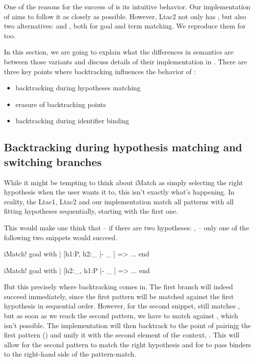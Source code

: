 One of the reasons for the success of  is its intuitive behavior.
Our implementation of  aims to follow it as closely as possible.
However, Ltac2 not only has , but also two alternatives:  and , both for goal and term matching.
We reproduce them for  too.

In this section, we are going to explain what the differences in semantics are between those variants and discuss details of their implementation in .
There are three key points where backtracking influences the behavior of :

\begin{minipage}{1.0\linewidth}
\begin{itemize}
\item backtracking during hypotheses matching
\item erasure of backtracking points
\item backtracking during identifier binding
\end{itemize}
\end{minipage}

\subsection{Backtracking during hypothesis matching and switching branches}

While it might be tempting to think about iMatch as simply selecting the right hypothesis when the user wants it to, this isn't exactly what's happening.
In reality, the Ltac1, Ltac2 and our implementation match all patterns with all fitting hypotheses sequentially, starting with the first one.

This would make one think that -- if there are two hypotheses: ,  -- only one of the following two snippets would succeed.
\begin{coq}
  iMatch! goal with
  | [h1:P, h2:_ |- _ ] => ...
  end
\end{coq}
\begin{coq}
  iMatch! goal with
  | [h2:_, h1:P |- _ ] => ...
  end
\end{coq}

But this precisely where backtracking comes in.
The first branch will indeed succeed immediately, since the first pattern will be matched against the first hypothesis in sequential order.
However, for the second snippet,  still matches \coqe{_}, but as soon as we reach the second pattern, we have to match  against , which isn't possible.
The implementation will then backtrack to the point of pairinjg the first pattern (\coqe{_}) and unify it with the second element of the context, .
This will allow for the second pattern to match the right hypothesis and for  to pass binders to the right-hand side of the pattern-match.

